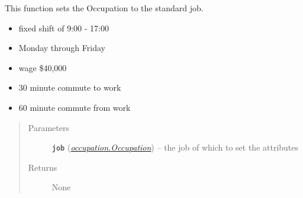 \documentclass[letterpaper,10pt,english]{sphinxmanual}
\begin{document}

\begin{fulllineitems}
\label{occupation:occupation.set_standard_job}
This function sets the Occupation to the standard job.
\begin{itemize}
\item {} 
fixed shift of 9:00 - 17:00

\item {} 
Monday through Friday

\item {} 
wage \$40,000

\item {} 
30 minute commute to work

\item {} 
60 minute commute from work

\end{itemize}
\begin{quote}\begin{description}
\item[{Parameters}] \leavevmode
\textbf{\texttt{job}} ({\hyperref[occupation:occupation.Occupation]{\emph{\emph{occupation.Occupation}}}}) -- the job of which to set the attributes

\item[{Returns}] \leavevmode
None

\end{description}\end{quote}

\end{fulllineitems}

\end{document}

